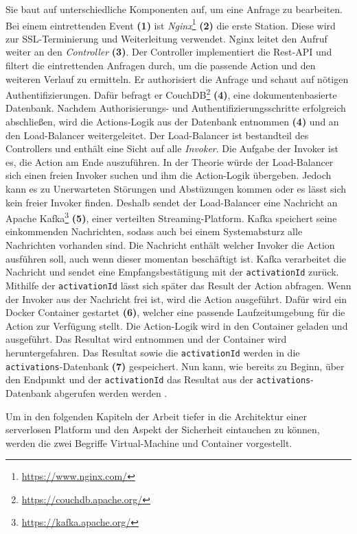 Sie baut auf unterschiedliche Komponenten auf,
um eine Anfrage zu bearbeiten. Bei einem eintrettenden Event \textbf{(1)}
ist \emph{Nginx}\footnote{\url{https://www.nginx.com/}} \textbf{(2)} die erste
Station. Diese wird zur SSL-Terminierung und Weiterleitung verwendet.
Nginx leitet den Aufruf weiter an den \emph{Controller} \textbf{(3)}.
Der Controller implementiert die Rest-API und filtert die
eintrettenden Anfragen durch, um die passende Action und
den weiteren Verlauf zu ermitteln.
Er authorisiert die Anfrage und schaut auf nötigen Authentifizierungen.
Dafür befragt er CouchDB\footnote{\url{https://couchdb.apache.org/}}
\textbf{(4)},
eine dokumentenbasierte Datenbank. Nachdem Authorisierungs-
und Authentifizierungsschritte erfolgreich abschließen,
wird die Actions-Logik aus der Datenbank entnommen \textbf{(4)} und an den
Load-Balancer weitergeleitet. Der Load-Balancer ist bestandteil
des Controllers und enthält eine Sicht auf alle \emph{Invoker}.
Die Aufgabe der Invoker ist es, die Action am Ende auszuführen.
In der Theorie würde der Load-Balancer sich einen freien Invoker suchen
und ihm die Action-Logik übergeben. Jedoch kann es zu Unerwarteten
Störungen und Abstüzungen kommen oder es lässt sich kein freier
Invoker finden. Deshalb sendet der Load-Balancer eine Nachricht an
Apache Kafka\footnote{\url{https://kafka.apache.org/}} \textbf{(5)},
einer verteilten Streaming-Platform. Kafka speichert seine
einkommenden Nachrichten, sodass auch bei einem Systemabsturz alle
Nachrichten vorhanden sind. Die Nachricht enthält welcher
Invoker die Action ausführen soll, auch wenn dieser momentan
beschäftigt ist. Kafka verarbeitet die Nachricht und sendet eine
Empfangsbestätigung mit der \texttt{activationId} zurück. Mithilfe
der \texttt{activationId} lässt sich später das Result der Action
abfragen. Wenn der Invoker aus der Nachricht frei ist, wird die
Action ausgeführt. Dafür wird ein Docker Container gestartet \textbf{(6)},
welcher eine passende Laufzeitumgebung für die Action zur Verfügung
stellt. Die Action-Logik wird in den Container geladen und ausgeführt.
Das Resultat wird entnommen und der Container wird heruntergefahren.
Das Resultat sowie die \texttt{activationId} werden in die
\texttt{activations}-Datenbank \textbf{(7)} gespeichert. Nun kann, wie bereits zu Beginn,
über den Endpunkt und der \texttt{activationId} das Resultat aus
der \texttt{activations}-Datenbank abgerufen werden werden
\cite{OpenWhiskGithub}.

Um in den folgenden Kapiteln der Arbeit tiefer in die Architektur einer
serverlosen Platform und den Aspekt der Sicherheit eintauchen zu können,
werden die zwei Begriffe Virtual-Machine und Container vorgestellt.

